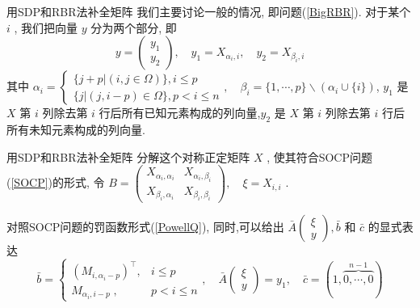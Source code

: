 \documentclass[slidestop, compress, mathserif, UTF8]{beamer}
\numberwithin{equation}{section}                                        %
\begin{document}
			\begin{frame}[t]{用SDP和RBR法补全矩阵}
				我们主要讨论一般的情况, 即问题(\ref{BigRBR}). 对于某个 $i$ , 我们把向量 $y$ 分为两个部分, 即
				\begin{equation}\label{BigRBRCondition1}
					y = \begin{pmatrix}y_1 \\ y_2\end{pmatrix}, \quad
					y_1 = X_{\alpha_i, i}, \quad
					y_2 = X_{\beta_i, i}
				\end{equation}
				\small{其中
				$
					\alpha_i=
						\begin{cases}
							\{j + p \vert (i, j \in \Omega)\}, i \leq p\\
							\{j \vert (j, i - p) \in \Omega\}, p < i \leq n
						\end{cases}
						,\quad
					\beta_i = 
						\{1, \cdots, p\} \backslash (\alpha_i \cup \{i\})
				$,
				$y_1$ 是 $X$ 第 $i$ 列除去第 $i$ 行后所有已知元素构成的列向量,$y_2$ 是 $X$ 第 $i$ 列除去第 $i$ 行后所有未知元素构成的列向量.}\normalsize
			\end{frame}
			\begin{frame}[t]{用SDP和RBR法补全矩阵}
				分解这个对称正定矩阵 $X$ , 使其符合SOCP问题(\ref{SOCP})的形式, 令
				$
						B 
					=	\begin{pmatrix}
							X_{\alpha_i, \alpha_i} & X_{\alpha_i, \beta_i} \\
							X_{\beta_i, \alpha_i} & X_{\beta_i, \beta_i}
						\end{pmatrix} ,\quad 
						\xi
					=	X_{i, i}
				$ .
				
				对照SOCP问题的罚函数形式(\ref{PowellQ}), 同时,可以给出 $\bar{A} \begin{pmatrix}\xi \\ y\end{pmatrix}, \bar{b}$ 和 $\bar{c}$ 的显式表达
				\begin{equation}\label{BigRBRCondition2}
						\bar{b}
					= 	\begin{cases}
							(M_{i,\alpha_i-p})^\top,&i\leq p\\
							M_{\alpha_i,i-p}\;,&p<i\leq n
						\end{cases}
						, \quad
						\bar{A} \begin{pmatrix} \xi \\ y \end{pmatrix}
					=	y_1
						, \quad
						\bar{c}
					=	(1, \overbrace{0, \cdots, 0}^{n - 1})
				\end{equation}
			\end{frame}
\end{document}
